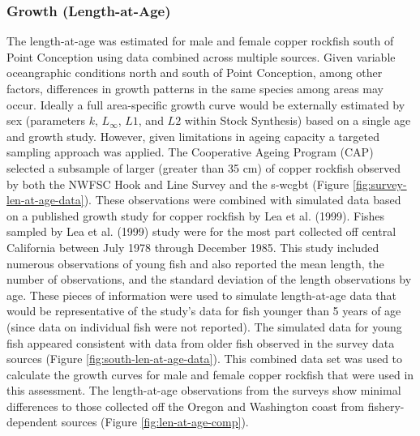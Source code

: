 \documentclass[11pt,
  english,
  a4paper,
]{article}
\begin{document}
\leavevmode\tagmcend\tagstructend\par


\hypertarget{growth-length-at-age}{%
\subsubsection{Growth (Length-at-Age)}\label{growth-length-at-age}}

\leavevmode\tagmcend\tagstructend


The length-at-age was estimated for male and female copper rockfish south of Point Conception using data combined across multiple sources. Given variable oceangraphic conditions north and south of Point Conception, among other factors, differences in growth patterns in the same species among areas may occur. Ideally a full area-specific growth curve would be externally estimated by sex (parameters {\(k\)\leavevmode\tagmcend\tagstructend}, {\(L_{\infty}\)\leavevmode\tagmcend\tagstructend}, {\(L1\)\leavevmode\tagmcend\tagstructend}, and {\(L2\)\leavevmode\tagmcend\tagstructend} within Stock Synthesis) based on a single age and growth study. However, given limitations in ageing capacity a targeted sampling approach was applied. The Cooperative Ageing Program (CAP) selected a subsample of larger (greater than 35 cm) of copper rockfish observed by both the NWFSC Hook and Line Survey and the \Gls{s-wcgbt} (Figure \ref{fig:survey-len-at-age-data}). These observations were combined with simulated data based on a published growth study for copper rockfish by Lea et al. {(1999)\leavevmode\tagmcend\tagstructend}. Fishes sampled by Lea et al. {(1999)\leavevmode\tagmcend\tagstructend} study were for the most part collected off central California between July 1978 through December 1985. This study included numerous observations of young fish and also reported the mean length, the number of observations, and the standard deviation of the length observations by age. These pieces of information were used to simulate length-at-age data that would be representative of the study's data for fish younger than 5 years of age (since data on individual fish were not reported). The simulated data for young fish appeared consistent with data from older fish observed in the survey data sources (Figure \ref{fig:south-len-at-age-data}). This combined data set was used to calculate the growth curves for male and female copper rockfish that were used in this assessment. The length-at-age observations from the surveys show minimal differences to those collected off the Oregon and Washington coast from fishery-dependent sources (Figure \ref{fig:len-at-age-comp}).
\end{document}
